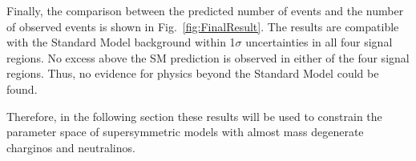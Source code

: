 \renewcommand{\arraystretch}{2.0}
\begin{table}[!h]
\centering
\caption{Background prediction in the four exclusive signal regions for the fake and the leptonic background.}
\label{tab:BackgroundPrediction}
\end{table}

Finally, the comparison between the predicted number of events and the number of observed events is shown in Fig.~\ref{fig:FinalResult}.
The results are compatible with the Standard Model background within 1$\sigma$ uncertainties in all four signal regions.
No excess above the SM prediction is observed in either of the four signal regions.
Thus, no evidence for physics beyond the Standard Model could be found.

Therefore, in the following section these results will be used to constrain the parameter space of supersymmetric models with almost mass degenerate charginos and neutralinos.

